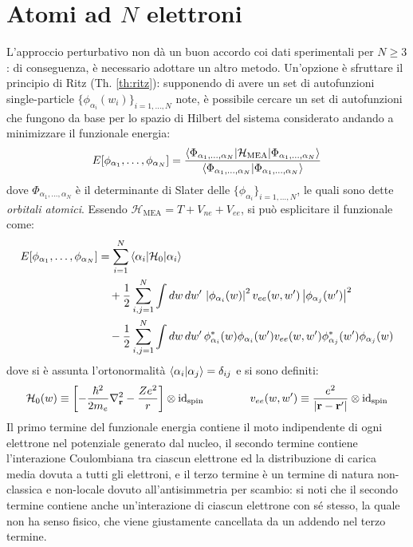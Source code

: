 
\section{Atomi ad \texorpdfstring{$ N $}{N} elettroni}

L'approccio perturbativo non dà un buon accordo coi dati sperimentali per $ N \ge 3 $: di conseguenza, è necessario adottare un altro metodo. Un'opzione è sfruttare il principio di Ritz (Th. \ref{th:ritz}): supponendo di avere un set di autofunzioni single-particle $ \{\phi_{\alpha_i}(w_i)\}_{i = 1, \dots, N} $ note, è possibile cercare un set di autofunzioni che fungono da base per lo spazio di Hilbert del sistema considerato andando a minimizzare il funzionale energia:
\begin{equation}
	E[\phi_{\alpha_1}, \dots, \phi_{\alpha_N}] = \frac{\braket{\Phi_{\alpha_1, \dots, \alpha_N} | \mathcal{H}_\text{MEA} | \Phi_{\alpha_1, \dots, \alpha_N}}}{\braket{\Phi_{\alpha_1, \dots, \alpha_N} | \Phi_{\alpha_1, \dots, \alpha_N}}}
	\label{eq:en-functional-def}
\end{equation}
dove $ \Phi_{\alpha_1, \dots, \alpha_N} $ è il determinante di Slater delle $ \{\phi_{\alpha_i}\}_{i = 1, \dots, N} $, le quali sono dette \textit{orbitali atomici}. Essendo $ \mathcal{H}_\text{MEA} = T + V_{ne} + V_{ee} $, si può esplicitare il funzionale come:
\begin{equation}
	\begin{split}
		E[\phi_{\alpha_1}, \dots, \phi_{\alpha_N}]
		& = \sum_{i = 1}^{N} \braket{\alpha_i | \mathcal{H}_0 | \alpha_i} \\
		& \quad + \frac{1}{2} \sum_{i,j = 1}^{N} \int dw\,dw'\, \left\lvert\phi_{\alpha_i}(w)\right\rvert^2 v_{ee}(w,w') \left\lvert\phi_{\alpha_j}(w')\right\rvert^2 \\
		& \quad - \frac{1}{2} \sum_{i,j = 1}^{N} \int dw\,dw'\, \phi_{\alpha_i}^*(w) \phi_{\alpha_i}(w') v_{ee}(w,w') \phi_{\alpha_j}^*(w') \phi_{\alpha_j}(w)
	\end{split}
	\label{eq:en-functional}
\end{equation}
dove si è assunta l'ortonormalità $ \braket{\alpha_i | \alpha_j} = \delta_{ij} $ e si sono definiti:
\begin{equation}
	\mathcal{H}_0(w) \equiv \left[ -\frac{\hbar^2}{2m_e} \nabla^2_{\mathbf{r}} - \frac{Ze^2}{r} \right] \otimes \operatorname{id}_\text{spin}
	\qquad \qquad
	v_{ee}(w,w') \equiv \frac{e^2}{\left\lvert\mathbf{r} - \mathbf{r}'\right\rvert} \otimes \operatorname{id}_\text{spin}
\end{equation}
Il primo termine del funzionale energia contiene il moto indipendente di ogni elettrone nel potenziale generato dal nucleo, il secondo termine contiene l'interazione Coulombiana tra ciascun elettrone ed la distribuzione di carica media dovuta a tutti gli elettroni, e il terzo termine è un termine di natura non-classica e non-locale dovuto all'antisimmetria per scambio: si noti che il secondo termine contiene anche un'interazione di ciascun elettrone con sé stesso, la quale non ha senso fisico, che viene giustamente cancellata da un addendo nel terzo termine.


